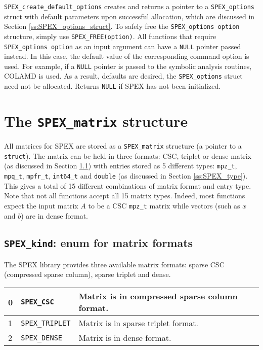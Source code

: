 \documentclass[12pt]{report}
\theoremstyle{definition}
\begin{document}
\verb|SPEX_create_default_options| creates and returns a pointer to a
\verb|SPEX_options| struct with default parameters upon successful allocation,
which are discussed in Section \ref{ss:SPEX_options_struct}.  To safely free
the \verb|SPEX_options option| structure, simply use \newline \verb|SPEX_FREE(option)|.
All functions that require \verb|SPEX_options option| as an input argument can
have a \verb'NULL' pointer passed instead. In this case, the default value of
the corresponding command option is used. For example, if a \verb'NULL' pointer
is passed to the symbolic analysis routines, COLAMD is used. As a result,
defaults are desired, the \verb|SPEX_options| struct need not be allocated.
Returns \verb|NULL| if SPEX has not been initialized.

\cprotect\section{The \verb|SPEX_matrix| structure} \label{ss:SPEX_matrix}

All matrices for SPEX are stored as a \verb|SPEX_matrix| structure (a pointer
to a \verb'struct').  The matrix can be held in three formats: CSC, triplet or
dense matrix (as discussed in Section \ref{ss:SPEX_kind}) with entries stored
as 5 different types: \verb|mpz_t|, \verb|mpq_t|, \verb|mpfr_t|, \verb|int64_t|
and \verb|double| (as discussed in Section \ref{ss:SPEX_type}).  This gives a
total of 15 different combinations of matrix format and entry type. Note that
not all functions accept all 15 matrix types. Indeed, most functions expect the
input matrix $A$ to be a CSC \verb|mpz_t| matrix while vectors (such as $x$ and
$b$) are in dense format.

\cprotect\subsection{\verb|SPEX_kind|: enum for matrix formats}
\label{ss:SPEX_kind}

The SPEX library provides three available matrix formats: sparse CSC
(compressed sparse column), sparse triplet and dense.

{\small
\begin{center}
\begin{tabular}{llp{4in}}
\hline
0 & \verb|SPEX_CSC| & Matrix is in compressed sparse column format. \\
\hline
1 & \verb|SPEX_TRIPLET|      & Matrix is in sparse triplet format. \\
\hline
2 & \verb|SPEX_DENSE|        & Matrix is in dense format.\\
\hline
\end{tabular}
\label{tab:SPEX_kind}
\end{center}
}
\end{document}
